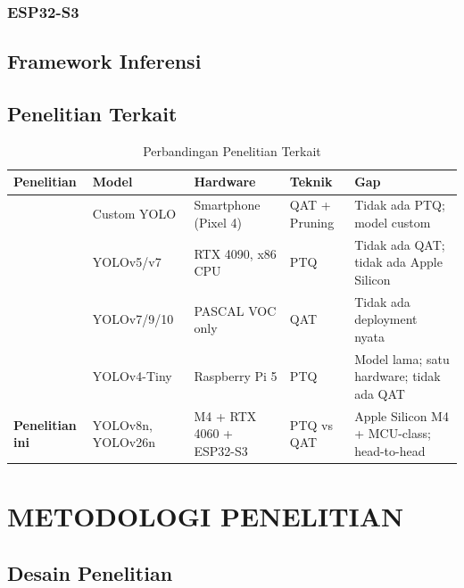 \documentclass[12pt, a4paper]{report}
\begin{document}
\subsection{ESP32-S3}

\section{Framework Inferensi}

\section{Penelitian Terkait}

\begin{table}[H]
  \centering
  \caption{Perbandingan Penelitian Terkait}
  \label{tab:related_work}
  \begin{tabularx}{\textwidth}{lXXXX}
    \toprule
    \textbf{Penelitian} & \textbf{Model} & \textbf{Hardware} &
    \textbf{Teknik} & \textbf{Gap} \\
    \midrule
    \cite{idama2024qatfp} & Custom YOLO & Smartphone (Pixel 4) &
      QAT + Pruning & Tidak ada PTQ; model custom \\
    \cite{wangqyolo2023} & YOLOv5/v7 & RTX 4090, x86 CPU &
      PTQ & Tidak ada QAT; tidak ada Apple Silicon \\
    \cite{seo2025lltq} & YOLOv7/9/10 & PASCAL VOC only &
      QAT & Tidak ada deployment nyata \\
    \cite{boddu2025yolov4} & YOLOv4-Tiny & Raspberry Pi 5 &
      PTQ & Model lama; satu hardware; tidak ada QAT \\
    \textbf{Penelitian ini} & YOLOv8n, YOLOv26n &
      M4 + RTX 4060 + ESP32-S3 &
      PTQ vs QAT & Apple Silicon M4 + MCU-class; head-to-head \\
    \bottomrule
  \end{tabularx}
\end{table}

\chapter{METODOLOGI PENELITIAN}

\section{Desain Penelitian}
\end{document}
